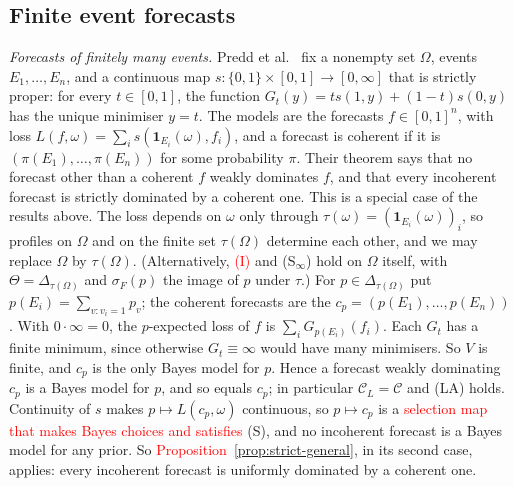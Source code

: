 \documentclass[11pt]{article}
\theoremstyle{definition}
\theoremstyle{remark}
\newcommand{\C}{\mathcal C}
\newcommand{\one}{\mathbf 1}
\begin{document}
\subsection{Finite event forecasts}\label{sec:forecasts}
\emph{Forecasts of finitely many events.} Predd et al.~\cite[Theorem~1]{Predd} fix a nonempty set $\Omega$, events $E_1,\dots,E_n$, and a continuous map $s:\{0,1\}\times[0,1]\to[0,\infty]$ that is strictly proper: for every $t\in[0,1]$, the function $G_t(y)=ts(1,y)+(1-t)s(0,y)$ has the unique minimiser $y=t$. The models are the forecasts $f\in[0,1]^n$, with loss $L(f,\omega)=\sum_is(\one_{E_i}(\omega),f_i)$, and a forecast is coherent if it is $(\pi(E_1),\dots,\pi(E_n))$ for some probability $\pi$. Their theorem says that no forecast other than a coherent $f$ weakly dominates $f$, and that every incoherent forecast is strictly dominated by a coherent one. This is a special case of the results above. The loss depends on $\omega$ only through $\tau(\omega)=(\one_{E_i}(\omega))_i$, so profiles on $\Omega$ and on the finite set $\tau(\Omega)$ determine each other, and we may replace $\Omega$ by $\tau(\Omega)$. (Alternatively, \textcolor{red}{(I)} and (S$_\infty$) hold on $\Omega$ itself, with $\Theta=\Delta_{\tau(\Omega)}$ and $\sigma_F(p)$ the image of $p$ under $\tau$.) For $p\in\Delta_{\tau(\Omega)}$ put $p(E_i)=\sum_{v:v_i=1}p_v$; the coherent forecasts are the $c_p=(p(E_1),\dots,p(E_n))$. With $0\cdot\infty=0$, the $p$-expected loss of $f$ is $\sum_iG_{p(E_i)}(f_i)$. Each $G_t$ has a finite minimum, since otherwise $G_t\equiv\infty$ would have many minimisers. So $V$ is finite, and $c_p$ is the only Bayes model for $p$. Hence a forecast weakly dominating $c_p$ is a Bayes model for $p$, and so equals $c_p$; in particular $\C_L=\C$ and (LA) holds. Continuity of $s$ makes $p\mapsto L(c_p,\omega)$ continuous, so $p\mapsto c_p$ is a \textcolor{red}{selection map that makes Bayes choices and satisfies} (S), and no incoherent forecast is a Bayes model for any prior. So \textcolor{red}{Proposition~\ref{prop:strict-general}}, in its second case, applies: every incoherent forecast is uniformly dominated by a coherent one.
\end{document}
